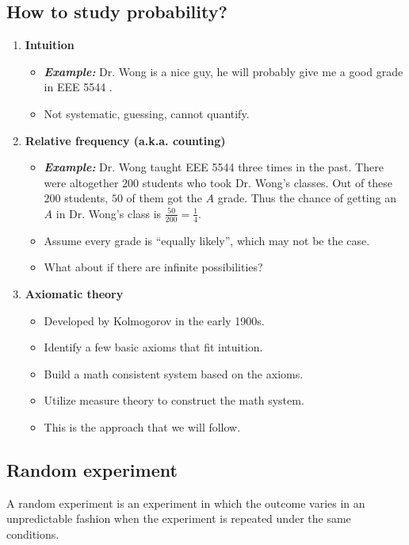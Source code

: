 \subsection{How to study probability?}
\begin{enumerate}
\item \textbf{Intuition}
\begin{itemize}
\item \emph{\bf{Example:} } Dr. Wong is a nice guy, he will probably give me a good grade in EEE 5544 .
\item Not systematic, guessing, cannot quantify.
\end{itemize}

\item \textbf{Relative frequency (a.k.a. counting)} 
\begin{itemize}
\item \emph{\bf{Example:} } Dr. Wong taught EEE 5544 three times in the
  past. There were altogether $200$ students who took Dr. Wong's
  classes. Out of these $200$ students, $50$ of them got the \(A\) grade.
  Thus the chance of getting an \(A\) in Dr. Wong's class is
  \(\frac{50}{200}=\frac{1}{4}\).
\item Assume every grade is ``equally likely'', which may not be the case.
\item What about if there are infinite possibilities?
\end{itemize}

\item \textbf{Axiomatic theory} 
\begin{itemize}
  \item Developed by Kolmogorov in the early 1900s.
  \item Identify a few basic axioms that fit intuition.
  \item Build a math consistent system based on the axioms.
  \item Utilize measure theory to construct the math system.
  \item This is the approach that we will follow.
\end{itemize}
\end{enumerate}

\subsection{Random experiment}

A random experiment is an experiment in which the outcome varies in an
unpredictable fashion when the experiment is repeated under the same conditions.
